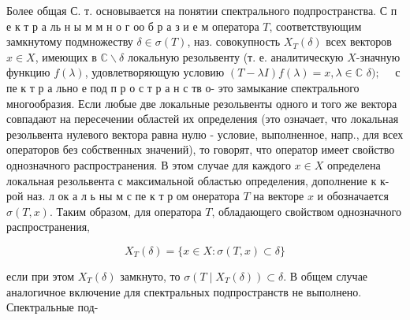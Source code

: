 \documentclass[10pt]{article}
\begin{document}
Более общая С. т. основывается на понятии спектрального подпространства. С п е к т р а ль н ы м м н о г оо б р а з и е м оператора $T$, соответствующим замкнутому подмножеству $\delta \in \sigma(T)$, наз. совокупность $X_{T}(\delta)$ всех векторов $x \in X$, имеющих в $\mathbb{C} \backslash \delta$ локальную резольвенту (т. е. аналитическую $X$-значную функцию $f(\lambda)$, удовлетворяющую условию $(T-\lambda I) f(\lambda)=x, \lambda \in \mathbb{C}$ $\delta) ; \quad$ с пе к т р а льно е под п р о с т р а н с тв о- это замыкание спектрального многообразия. Если любые две локальные резольвенты одного и того же вектора совпадают на пересечении областей их определения (это означает, что локальная резольвента нулевого вектора равна нулю - условие, выполненное, напр., для всех операторов без собственных значений), то говорят, что оператор имеет свойство однозначного распространения. В этом случае для каждого $x \in X$ определена локальная резольвента с максимальной областью определения, дополнение к к-рой наз. л ок а л ь ны м с пе к т р ом онератора $T$ на векторе $x$ и обозначается $\sigma(T, x)$. Таким образом, для оператора $T$, обладающего свойством однозначного распространения,



\[

X_{T}(\delta)=\{x \in X: \sigma(T, x) \subset \delta\}

\]



если при этом $X_{T}(\delta)$ замкнуто, то $\sigma\left(T \mid X_{T}(\delta)\right) \subset \delta$. В общем случае аналогичное включение для спектральных подпространств не выполнено. Спектральные под-
\end{document}
